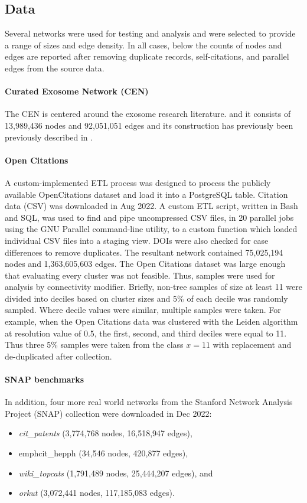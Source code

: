 \documentclass[12pt, oneside]{article}   	%
\begin{document}
\subsection{Data} Several networks were used for testing and analysis and were selected to provide a range of sizes and edge density. In all cases, below the counts of nodes and edges are reported after removing duplicate records, 
self-citations, and parallel edges from the source data. 


\paragraph{Curated Exosome Network (CEN)}
The CEN is centered around the exosome research literature. and it consists of 13,989,436 nodes and 92,051,051 edges and its construction has previously been previously described in \cite{Jakatdar_2022}.  

\paragraph{Open Citations}
A custom-implemented ETL process was designed to process the publicly available OpenCitations dataset \citep{Peroni2020} and load it into a PostgreSQL table. Citation data (CSV) was downloaded in Aug 2022. A custom ETL script, written in Bash and SQL, was used to find and pipe uncompressed CSV files, in 20 parallel jobs using the GNU Parallel command-line utility, to a custom function which loaded individual CSV files into a staging view. DOIs were also checked for case differences to remove duplicates.  The resultant network contained 75,025,194 nodes and 1,363,605,603 edges.  
The Open Citations dataset was large enough that evaluating every cluster was not feasible. Thus, samples were used for analysis by connectivity modifier. Briefly, non-tree samples of size at least 11 were divided into deciles based on cluster sizes and 5\% of each decile was randomly sampled. Where decile values were similar, multiple samples were taken. For example, when the Open Citations data was clustered with the Leiden algorithm at resolution value of 0.5, the first, second, and third deciles were equal to 11. Thus three 5\% samples were taken from the class $x=11$ with replacement and de-duplicated after collection. 

\paragraph{SNAP benchmarks}
In addition, four more real world networks from the Stanford Network Analysis Project (SNAP) collection \citep{leskovec2016snap} were downloaded in Dec 2022:
\begin{itemize}
\item  \emph{cit\_patents} (3,774,768 nodes, 16,518,947 edges), \
\item emph{cit\_hepph} (34,546 nodes, 420,877 edges),
\item  \emph{wiki\_topcats} (1,791,489 nodes, 25,444,207 edges), and
\item  \emph{orkut} (3,072,441 nodes, 117,185,083 edges). 
\end{itemize}
\end{document}
